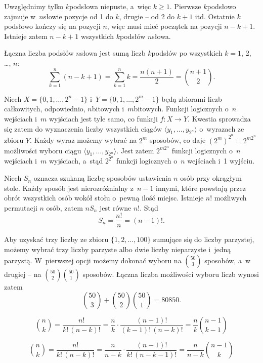 
\exercise %
Uwzględnimy tylko $k$\nbhyphen podsłowa niepuste, a~więc $k\ge1$.
Pierwsze $k$\nbhyphen podsłowo zajmuje w~$n$\nbhyphen słowie pozycje od 1 do $k$, drugie -- od 2 do $k+1$ itd.
Ostatnie $k$\nbhyphen podsłowo kończy się na pozycji $n$, więc musi mieć początek na pozycji $n-k+1$.
Istnieje zatem $n-k+1$ wszystkich $k$\nbhyphen podsłów $n$\nbhyphen słowa.

Łączna liczba podsłów $n$\nbhyphen słowa jest sumą liczb $k$\nbhyphen podsłów po wszystkich $k=1$, 2, \dots, $n$:
\[
	\sum_{k=1}^n(n-k+1) = \sum_{k=1}^nk = \frac{n(n+1)}{2} = \binom{n+1}{2}.
\]

\exercise %
Niech $X=\{0,1,\dots,2^n-1\}$ i~$Y=\{0,1,\dots,2^m-1\}$ będą zbiorami liczb całkowitych, odpowiednio, $n$\nbhyphen bitowych i~$m$\nbhyphen bitowych.
Funkcji logicznych o~$n$ wejściach i~$m$ wyjściach jest tyle samo, co funkcji $f\colon X\to Y$.
Kwestia sprowadza się zatem do wyznaczenia liczby wszystkich ciągów $\langle y_1,\dots,y_{2^n}\!\rangle$ o~wyrazach ze zbioru $Y$.
Każdy wyraz możemy wybrać na $2^m$ sposobów, co daje $(2^m)^{2^n}=2^{m2^n}\!$ możliwości wyboru ciągu $\langle y_1,\dots,y_{2^n}\!\rangle$.
Jest zatem $2^{m2^n}\!$ funkcji logicznych o~$n$ wejściach i~$m$ wyjściach, a~stąd $2^{2^n}\!$ funkcji logicznych o~$n$ wejściach i~1 wyjściu.

\exercise %
Niech $S_n$ oznacza szukaną liczbę sposobów ustawienia $n$ osób przy okrągłym stole.
Każdy sposób jest nierozróżnialny z~$n-1$ innymi, które powstają przez obrót wszystkich osób wokół stołu o~pewną ilość miejsc.
Istnieje $n!$ możliwych permutacji $n$ osób, zatem $nS_n$ jest równe $n!$.
Stąd
\[
	S_n = \frac{n!}{n} = (n-1)!.
\]

\exercise %
Aby uzyskać trzy liczby ze zbioru $\{1,2,\dots,100\}$ sumujące się do liczby parzystej, możemy wybrać trzy liczby parzyste albo dwie liczby nieparzyste i~jedną parzystą.
W~pierwszej opcji możemy dokonać wyboru na $\binom{50}{3}$ sposobów, a~w drugiej -- na $\binom{50}{2}\binom{50}{1}$ sposobów.
Łączna liczba możliwości wyboru liczb wynosi zatem
\[
	\binom{50}{3}+\binom{50}{2}\binom{50}{1} = 80850.
\]

\exercise %
\[
	\binom{n}{k} = \frac{n!}{k!\,(n-k)!} = \frac{n}{k}\cdot\frac{(n-1)!}{(k-1)!\,(n-k)!} = \frac{n}{k}\binom{n-1}{k-1}
\]

\exercise %
\[
	\binom{n}{k} = \frac{n!}{k!\,(n-k)!} = \frac{n}{n-k}\cdot\frac{(n-1)!}{k!\,(n-k-1)!} = \frac{n}{n-k}\binom{n-1}{k}
\]

